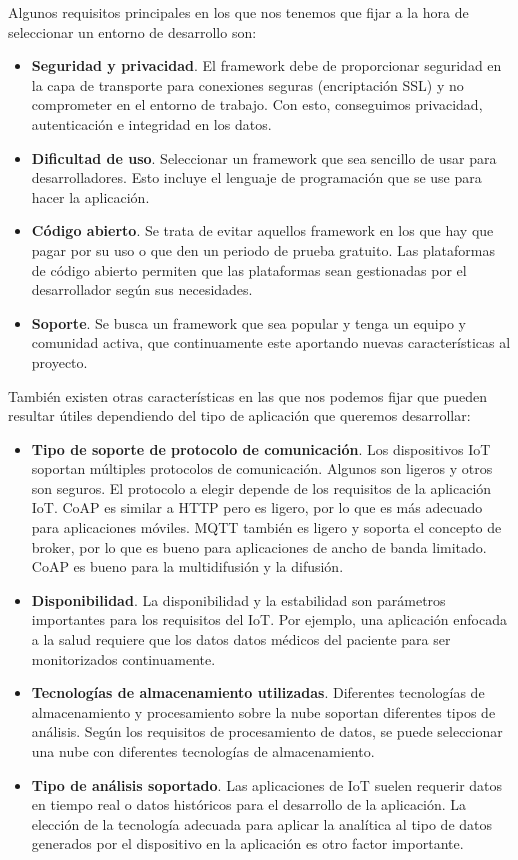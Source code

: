 {Algunos requisitos principales en los que nos tenemos que fijar a la hora de seleccionar un entorno de desarrollo son:

\begin{itemize}
    \item \textbf{Seguridad y privacidad}. El framework debe de proporcionar seguridad en la capa de transporte para conexiones seguras (encriptación SSL) y no comprometer en el entorno de trabajo. Con esto, conseguimos privacidad, autenticación e integridad en los datos. 
    \item \textbf{Dificultad de uso}. Seleccionar un framework que sea sencillo de usar para desarrolladores. Esto incluye el lenguaje de programación que se use para hacer la aplicación.
    \item \textbf{Código abierto}. Se trata de evitar aquellos framework en los que hay que pagar por su uso o que den un periodo de prueba gratuito. Las plataformas de código abierto permiten que las plataformas sean gestionadas por el desarrollador según sus necesidades.
    \item \textbf{Soporte}. Se busca un framework que sea popular y tenga un equipo y comunidad activa, que continuamente este aportando nuevas características al proyecto.
\end{itemize}

También existen otras características en las que nos podemos fijar que pueden resultar útiles dependiendo del tipo de aplicación que queremos desarrollar:

\begin{itemize}
    \item \textbf{Tipo de soporte de protocolo de comunicación}. Los dispositivos IoT soportan múltiples protocolos de comunicación. Algunos son ligeros y otros son seguros. El protocolo a elegir depende de los requisitos de la aplicación IoT. CoAP es similar a HTTP pero es ligero, por lo que es más adecuado para aplicaciones móviles. MQTT también es ligero y soporta el concepto de broker, por lo que es bueno para aplicaciones de ancho de banda limitado. CoAP es bueno para la multidifusión y la difusión.
    \item \textbf{Disponibilidad}. La disponibilidad y la estabilidad son parámetros importantes para los requisitos del IoT. Por ejemplo, una aplicación enfocada a la salud requiere que los datos datos médicos del paciente para ser monitorizados continuamente.
    \item \textbf{Tecnologías de almacenamiento utilizadas}. Diferentes tecnologías de almacenamiento y procesamiento sobre la nube soportan diferentes tipos de análisis. Según los requisitos de procesamiento de datos, se puede seleccionar una nube con diferentes tecnologías de almacenamiento.
    \item \textbf{Tipo de análisis soportado}. Las aplicaciones de IoT suelen requerir datos en tiempo real o datos históricos para el desarrollo de la aplicación. La elección de la tecnología adecuada para aplicar la analítica al tipo de datos generados por el dispositivo en la aplicación es otro factor importante.
\end{itemize}

}

